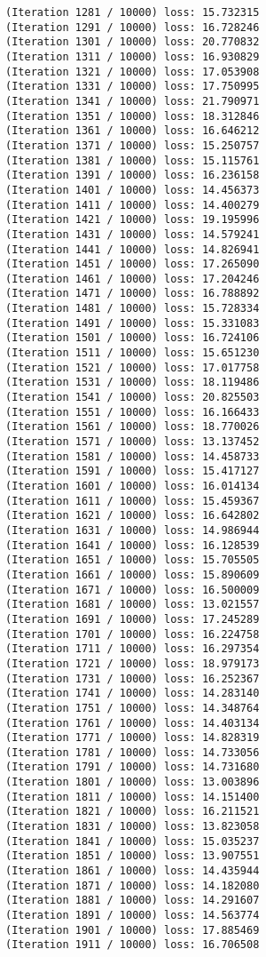 \documentclass[11pt]{article}
\begin{document}
\begin{Verbatim}[commandchars=\\\{\}]
(Iteration 1281 / 10000) loss: 15.732315
(Iteration 1291 / 10000) loss: 16.728246
(Iteration 1301 / 10000) loss: 20.770832
(Iteration 1311 / 10000) loss: 16.930829
(Iteration 1321 / 10000) loss: 17.053908
(Iteration 1331 / 10000) loss: 17.750995
(Iteration 1341 / 10000) loss: 21.790971
(Iteration 1351 / 10000) loss: 18.312846
(Iteration 1361 / 10000) loss: 16.646212
(Iteration 1371 / 10000) loss: 15.250757
(Iteration 1381 / 10000) loss: 15.115761
(Iteration 1391 / 10000) loss: 16.236158
(Iteration 1401 / 10000) loss: 14.456373
(Iteration 1411 / 10000) loss: 14.400279
(Iteration 1421 / 10000) loss: 19.195996
(Iteration 1431 / 10000) loss: 14.579241
(Iteration 1441 / 10000) loss: 14.826941
(Iteration 1451 / 10000) loss: 17.265090
(Iteration 1461 / 10000) loss: 17.204246
(Iteration 1471 / 10000) loss: 16.788892
(Iteration 1481 / 10000) loss: 15.728334
(Iteration 1491 / 10000) loss: 15.331083
(Iteration 1501 / 10000) loss: 16.724106
(Iteration 1511 / 10000) loss: 15.651230
(Iteration 1521 / 10000) loss: 17.017758
(Iteration 1531 / 10000) loss: 18.119486
(Iteration 1541 / 10000) loss: 20.825503
(Iteration 1551 / 10000) loss: 16.166433
(Iteration 1561 / 10000) loss: 18.770026
(Iteration 1571 / 10000) loss: 13.137452
(Iteration 1581 / 10000) loss: 14.458733
(Iteration 1591 / 10000) loss: 15.417127
(Iteration 1601 / 10000) loss: 16.014134
(Iteration 1611 / 10000) loss: 15.459367
(Iteration 1621 / 10000) loss: 16.642802
(Iteration 1631 / 10000) loss: 14.986944
(Iteration 1641 / 10000) loss: 16.128539
(Iteration 1651 / 10000) loss: 15.705505
(Iteration 1661 / 10000) loss: 15.890609
(Iteration 1671 / 10000) loss: 16.500009
(Iteration 1681 / 10000) loss: 13.021557
(Iteration 1691 / 10000) loss: 17.245289
(Iteration 1701 / 10000) loss: 16.224758
(Iteration 1711 / 10000) loss: 16.297354
(Iteration 1721 / 10000) loss: 18.979173
(Iteration 1731 / 10000) loss: 16.252367
(Iteration 1741 / 10000) loss: 14.283140
(Iteration 1751 / 10000) loss: 14.348764
(Iteration 1761 / 10000) loss: 14.403134
(Iteration 1771 / 10000) loss: 14.828319
(Iteration 1781 / 10000) loss: 14.733056
(Iteration 1791 / 10000) loss: 14.731680
(Iteration 1801 / 10000) loss: 13.003896
(Iteration 1811 / 10000) loss: 14.151400
(Iteration 1821 / 10000) loss: 16.211521
(Iteration 1831 / 10000) loss: 13.823058
(Iteration 1841 / 10000) loss: 15.035237
(Iteration 1851 / 10000) loss: 13.907551
(Iteration 1861 / 10000) loss: 14.435944
(Iteration 1871 / 10000) loss: 14.182080
(Iteration 1881 / 10000) loss: 14.291607
(Iteration 1891 / 10000) loss: 14.563774
(Iteration 1901 / 10000) loss: 17.885469
(Iteration 1911 / 10000) loss: 16.706508

\end{Verbatim}
\end{document}
